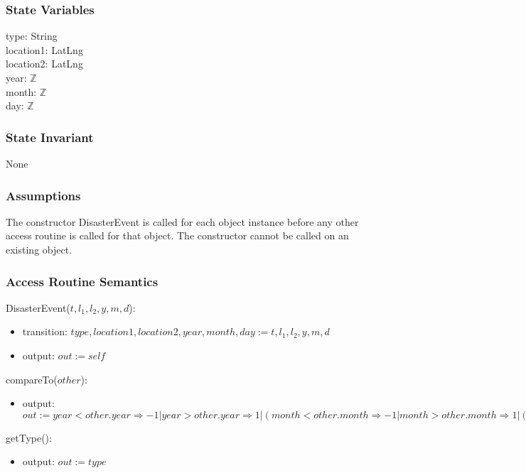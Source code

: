 \documentclass[12pt]{article}
\begin{document}
\subsubsection* {State Variables}

type: String \\
location1: LatLng \\
location2: LatLng \\
year: $\mathbb{Z}$ \\
month: $\mathbb{Z}$ \\
day: $\mathbb{Z}$ \\

\subsubsection* {State Invariant}

None

\subsubsection* {Assumptions}

The constructor DisasterEvent is called for each object instance before any other access routine is called for that object. The constructor cannot be called on an existing object.

\subsubsection* {Access Routine Semantics}

DisasterEvent($t, l_1, l_2, y, m, d$):
\begin{itemize}
\item transition: $type, location1, location2, year, month, day := t, l_1, l_2, y, m, d$
\item output: $out := \mathit{self}$
\end{itemize}

\noindent compareTo($other$):
\begin{itemize}
\item output: $out := year < other.year \Rightarrow -1 | year > other.year \Rightarrow 1 | (month < other.month \Rightarrow -1 | month > other.month \Rightarrow 1 | (day < other.day \Rightarrow -1 | day > other.day \Rightarrow 1 | 0))$
\end{itemize}

\noindent getType():
\begin{itemize}
\item output: $out := type$
\end{itemize}
\end{document}
